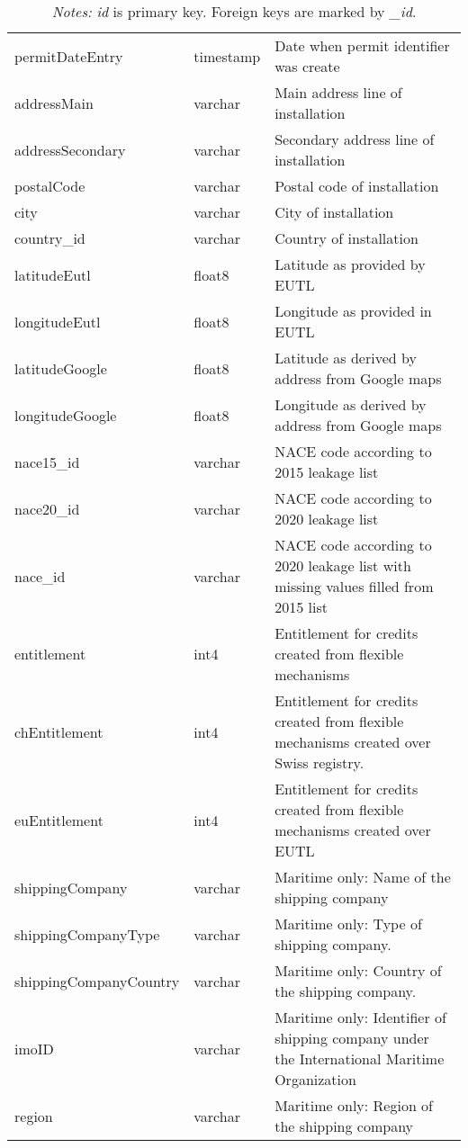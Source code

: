 \documentclass[authoryear]{elsarticle}
\begin{document}
\begin{table}[tbp]
\begin{tabular*}{\textwidth}{@{}@{\extracolsep{\fill}} llp{8cm} @{}}
		permitDateEntry & timestamp & Date when permit identifier was create \\
		addressMain & varchar & Main address line of installation \\
		addressSecondary & varchar & Secondary address line of installation \\
		postalCode & varchar & Postal code of installation \\
		city  & varchar & City of installation \\
		country\_id & varchar & Country of installation \\
		latitudeEutl & float8 & Latitude as provided by EUTL \\
		longitudeEutl & float8 & Longitude as provided in EUTL \\
		latitudeGoogle & float8 & Latitude as derived by address from Google maps \\
		longitudeGoogle & float8 & Longitude as derived by address from Google maps \\
		nace15\_id & varchar & NACE code according to 2015 leakage list \\
		nace20\_id & varchar & NACE code according to 2020 leakage list \\
		nace\_id & varchar & NACE code according to 2020 leakage list with missing values filled from 2015 list \\
		entitlement & int4  & Entitlement for credits created from flexible mechanisms \\
		chEntitlement & int4  & Entitlement for credits created from flexible mechanisms created over Swiss registry. \\
		euEntitlement & int4  & Entitlement for credits created from flexible mechanisms created over EUTL\\
		shippingCompany & varchar & Maritime only: Name of the shipping company\\
		shippingCompanyType & varchar &  Maritime only: Type of shipping company.\\
		shippingCompanyCountry & varchar &  Maritime only: Country of the shipping company.\\
		imoID & varchar &  Maritime only: Identifier of shipping company under the International Maritime Organization\\
		region & varchar &  Maritime only: Region of the shipping company\\
		\bottomrule
		\bottomrule
	\end{tabular*}%
	\vspace{-3ex}
\caption*{\footnotesize \emph{Notes:} \textit{id} is primary key. Foreign keys are marked by \textit{\_id}.}
\vspace{0ex}
\end{table}
\end{document}
